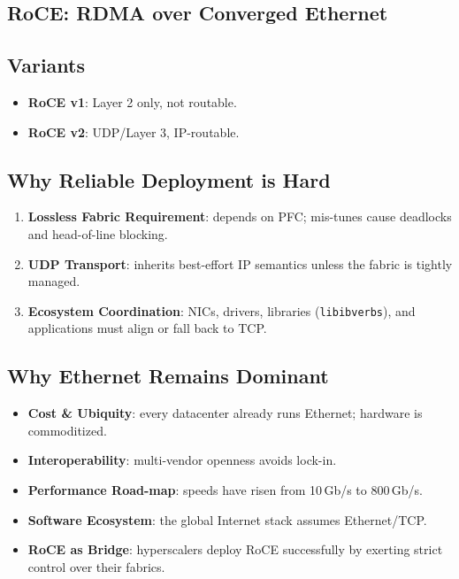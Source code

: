 \documentclass[../../../OAE-SPEC-MAIN.tex]{subfiles}
\begin{document}
\subsection{RoCE: RDMA over Converged Ethernet}
\subsection{Variants}
\begin{itemize}
  \item \textbf{RoCE v1}: Layer 2 only, not routable.
  \item \textbf{RoCE v2}: UDP/Layer 3, IP-routable.
\end{itemize}

\subsection{Why Reliable Deployment is Hard}
\begin{enumerate} 
  \item \textbf{Lossless Fabric Requirement}: depends on PFC; mis-tunes
        cause deadlocks and head-of-line blocking.
  \item \textbf{UDP Transport}: inherits best-effort IP semantics unless
        the fabric is tightly managed.
  \item \textbf{Ecosystem Coordination}: NICs, drivers, libraries
        (\texttt{libibverbs}), and applications must align or fall back
        to TCP.
\end{enumerate}

\subsection{Why Ethernet Remains Dominant}
\begin{itemize}
  \item \textbf{Cost \& Ubiquity}: every datacenter already runs
        Ethernet; hardware is commoditized.
  \item \textbf{Interoperability}: multi-vendor openness avoids lock-in.
  \item \textbf{Performance Road-map}: speeds have risen from
        10\,Gb/s to 800\,Gb/s.
  \item \textbf{Software Ecosystem}: the global Internet stack assumes
        Ethernet/TCP.
  \item \textbf{RoCE as Bridge}: hyperscalers deploy RoCE successfully
        by exerting strict control over their fabrics.
\end{itemize}
\end{document}
